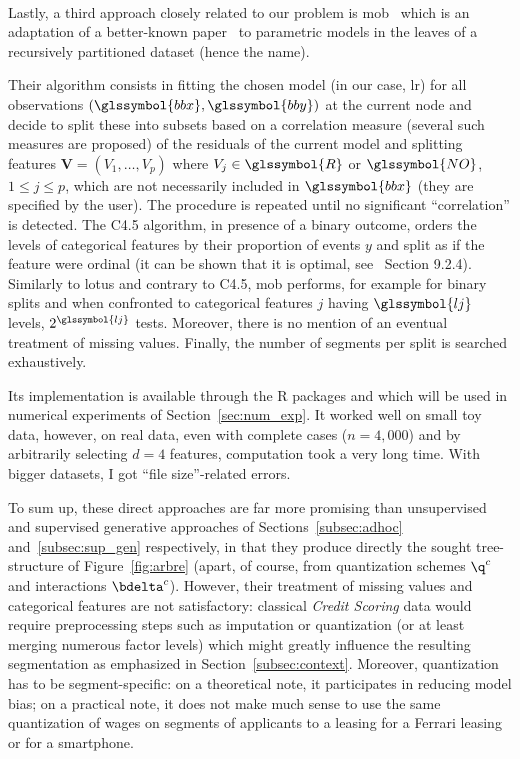 \paragraph{} \label{par:mob}

Lastly, a third approach closely related to our problem is \gls{mob}~\cite{zeileis2008model} which is an adaptation of a better-known paper~\cite{hothorn2006unbiased} to parametric models in the leaves of a recursively partitioned dataset (hence the name).

Their algorithm consists in fitting the chosen model (in our case, \gls{lr}) for all observations $(\glssymbol{bbx},\glssymbol{bby})$ at the current node and decide to split these into subsets based on a correlation measure (several such measures are proposed) of the residuals of the current model and splitting features $\bm{V} = (V_1, \dots, V_p)$ where $V_j \in \glssymbol{R}$ or $\glssymbol{NO}$, $1 \leq j \leq p$, which are not necessarily included in $\glssymbol{bbx}$ (they are specified by the user). The procedure is repeated until no significant ``correlation'' is detected. The C4.5 algorithm, in presence of a binary outcome, orders the levels of categorical features by their proportion of events $y$ and split as if the feature were ordinal (it can be shown that it is optimal, see~\cite{friedman2001elements} Section 9.2.4).  Similarly to \gls{lotus} and contrary to C4.5, \gls{mob} performs, for example for binary splits and when confronted to categorical features $j$ having $\glssymbol{lj}$ levels, $2^{\glssymbol{lj}}$ tests. Moreover, there is no mention of an eventual treatment of missing values. Finally, the number of segments per split is searched exhaustively.

Its implementation is available through the \textsf{R} packages  and  which will be used in numerical experiments of Section~\ref{sec:num_exp}. It worked well on small toy data, however, on real data, even with complete cases ($n = 4{,}000$) and by arbitrarily selecting $d = 4$ features, computation took a very long time. With bigger datasets, I got ``file size''-related errors.

\medskip

To sum up, these direct approaches are far more promising than unsupervised and supervised generative approaches of Sections~\ref{subsec:adhoc} and~\ref{subsec:sup_gen} respectively, in that they produce directly the sought tree-structure of Figure~\ref{fig:arbre} (apart, of course, from quantization schemes $\q^c$ and interactions $\bdelta^c$). However, their treatment of missing values and categorical features are not satisfactory: classical \textit{Credit Scoring} data would require preprocessing steps such as imputation or quantization (or at least merging numerous factor levels) which might greatly influence the resulting segmentation as emphasized in Section~\ref{subsec:context}. Moreover, quantization has to be segment-specific: on a theoretical note, it participates in reducing model bias; on a practical note, it does not make much sense to use the same quantization of wages on segments of applicants to a leasing for a Ferrari leasing or for a smartphone.


